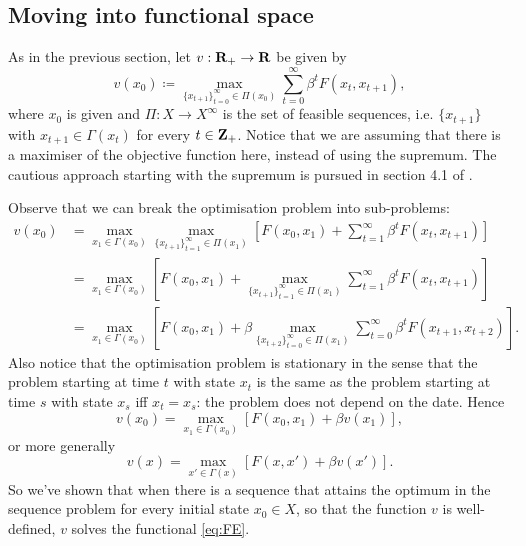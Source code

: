\documentclass[11pt,letterpaper,reqno,oneside]{article}
\begin{document}
\subsection{Moving into functional space}
\label{sec:23Sep2015:moving_into_functional_space}

As in the previous section, let $v : \mathbf{R}_+ \to \mathbf{R}$ be given by
%
\begin{equation*}
	v(x_0)
	\coloneqq \max_{ \{ x_{t+1} \}_{t=0}^\infty \in \Pi(x_0) } 
	\sum_{t=0}^\infty \beta^t F(x_t,x_{t+1}) ,
\end{equation*}
%
where $x_0$ is given and $\Pi : X \to X^\infty$ is the set of feasible sequences, i.e. $\{ x_{t+1} \}$ with $x_{t+1} \in \Gamma(x_t)$ for every $t \in \mathbf{Z}_+$. Notice that we are assuming that there is a maximiser of the objective function here, instead of using the supremum. The cautious approach starting with the supremum is pursued in section 4.1 of \textcite{StokeyLucasPrescott1989}.

Observe that we can break the optimisation problem into sub-problems:
%
\begin{align*}
	v(x_0)
	&= \max_{ x_1 \in \Gamma(x_0) } 
	\max_{ \{ x_{t+1} \}_{t=1}^\infty \in \Pi(x_1) } 
	\left[ F(x_0,x_1) + 
	\sum_{t=1}^\infty \beta^t F(x_t,x_{t+1})
	\right] 
	\\
	&= \max_{ x_1 \in \Gamma(x_0) } 
	\left[ F(x_0,x_1) + 
	\max_{ \{ x_{t+1} \}_{t=1}^\infty \in \Pi(x_1) } 
	\sum_{t=1}^\infty \beta^t F(x_t,x_{t+1})
	\right] 
	\\
	&= \max_{ x_1 \in \Gamma(x_0) } 
	\left[ F(x_0,x_1) + 
	\beta \max_{ \{ x_{t+2} \}_{t=0}^\infty \in \Pi(x_1) } 
	\sum_{t=0}^\infty \beta^t F(x_{t+1},x_{t+2})
	\right] .
\end{align*}
%
Also notice that the optimisation problem is stationary in the sense that the problem starting at time $t$ with state $x_t$ is the same as the problem starting at time $s$ with state $x_s$ iff $x_t=x_s$: the problem does not depend on the date. Hence
%
\begin{equation*}
	v(x_0)
	= \max_{ x_1 \in \Gamma(x_0) } 
	\left[ F(x_0,x_1) + 
	\beta v(x_1)
	\right] ,
\end{equation*}
%
or more generally
%
\begin{equation}
	v(x)
	= \max_{ x' \in \Gamma(x) } 
	\left[ F \left( x, x' \right) + \beta v \left( x' \right) \right] .
	\label{eq:FE}
\end{equation}
%
So we've shown that when there is a sequence that attains the optimum in the sequence problem for every initial state $x_0 \in X$, so that the function $v$ is well-defined, $v$ solves the functional \cref{eq:FE}.
\end{document}
